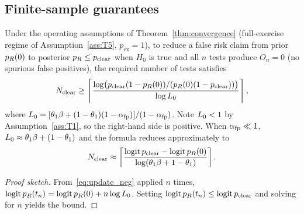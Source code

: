 \subsection{Finite-sample guarantees}

\begin{corollary}
\label{cor:n_clear}
Under the operating assumptions of
Theorem~\ref{thm:convergence} (full-exercise regime of
Assumption~\ref{ass:T5}, $p_{\mathrm{ex}} = 1$), to reduce a
false risk claim from prior $p_R(0)$ to posterior
$p_R \leq p_{\mathrm{clear}}$ when $H_0$ is true and all $n$
tests produce $O_n = 0$ (no spurious false positives), the
required number of tests satisfies
\begin{equation}
\label{eq:n_clear}
N_{\mathrm{clear}} \geq \left\lceil
  \frac{\log \bigl(p_{\mathrm{clear}} (1 - p_R(0)) / (p_R(0)(1 - p_{\mathrm{clear}}))\bigr)}
       {\log L_0}
\right\rceil,
\end{equation}
where $L_0 = [\theta_1 \beta + (1 - \theta_1)(1 - \alpha_{\mathrm{fp}})]/(1 - \alpha_{\mathrm{fp}})$.
Note $L_0 < 1$ by Assumption~\ref{ass:T1}, so the
right-hand side is positive.  When $\alpha_{\mathrm{fp}} \ll 1$,
$L_0 \approx \theta_1 \beta + (1 - \theta_1)$ and the
formula reduces approximately to
$$
N_{\mathrm{clear}} \approx \left\lceil
  \frac{\operatorname{logit} p_{\mathrm{clear}} - \operatorname{logit} p_R(0)}
       {\log(\theta_1 \beta + 1 - \theta_1)}
\right\rceil.
$$
\end{corollary}

\begin{proof}[Proof sketch]
From~\eqref{eq:update_neg} applied $n$ times,
$\operatorname{logit} p_R(t_n) = \operatorname{logit} p_R(0) + n \log L_0$.  Setting
$\operatorname{logit} p_R(t_n) \leq \operatorname{logit} p_{\mathrm{clear}}$ and solving
for $n$ yields the bound.
\end{proof}

